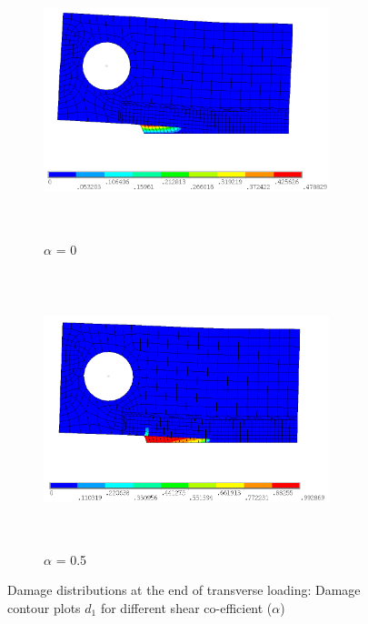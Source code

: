 \documentclass[a4paper,12pt,twoside]{report}
\begin{document}
\begin{figure}[htbp!]
       \captionsetup[subfigure]{justification=centering}
     \begin{subfigure}{0.4\textwidth}
         \includegraphics[width=8.3cm,height=8cm,keepaspectratio]{26.d1_a_0.png}
         \centering
         \caption{$\alpha$ = 0}
         \label{fig:d1-a_0}
     \end{subfigure}
    \hspace{1.8cm}
     \captionsetup[subfigure]{justification=centering}
     \begin{subfigure}{0.4\textwidth}
         \includegraphics[width=8.3cm,height=8cm,keepaspectratio]{26.d1_a_0.5.png}
         \centering
         \caption{$\alpha$ = 0.5}
         \label{fig:d1-a_0.5}
     \end{subfigure}
             \caption{Damage distributions at the end of transverse loading: Damage contour plots $d_{1}$ for different shear co-efficient ($\alpha$)}
        \label{fig: Damage contour plots alpha d1} 
\end{figure}
\FloatBarrier
\end{document}
